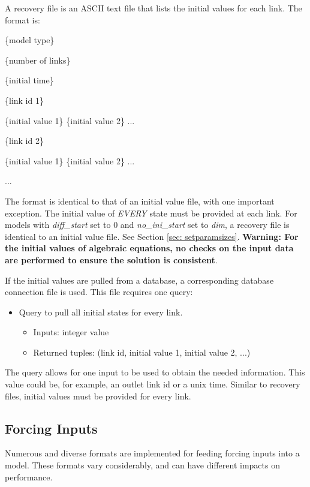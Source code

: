 \documentclass[12pt]{article}
\newenvironment{codeindent}
{\begin{list}{}
        {\setlength{\leftmargin}{.1in}}
        \item[]
}
{\end{list}}
\begin{document}
A recovery file is an ASCII text file that lists the initial values for each link. The format is:
\begin{codeindent}
 \{model type\}
 
 \{number of links\}
 
 \{initial time\}
 
 \{link id 1\}
 
 \{initial value 1\} \{initial value 2\} ...
 
 \{link id 2\}
 
 \{initial value 1\} \{initial value 2\} ...
 
 ...
\end{codeindent}
The format is identical to that of an initial value file, with one important exception. The initial value of \emph{EVERY} state must be provided at each link. For models with \emph{diff\_start} set to 0 and \emph{no\_ini\_start} set to \emph{dim}, a recovery file is identical to an initial value file. See Section \ref{sec: setparamsizes}. \textbf{Warning: For the initial values of algebraic equations, no checks on the input data are performed to ensure the solution is consistent}.

If the initial values are pulled from a database, a corresponding database connection file is used. This file requires one query:
\begin{itemize}
 \item Query to pull all initial states for every link. 
  \begin{itemize}
   \item Inputs: integer value
   \item Returned tuples: (link id, initial value 1, initial value 2, ...)
  \end{itemize}
\end{itemize}
The query allows for one input to be used to obtain the needed information. This value could be, for example, an outlet link id or a unix time. Similar to recovery files, initial values must be provided for every link.


\subsection{Forcing Inputs} \label{sec: forcing inputs}

Numerous and diverse formats are implemented for feeding forcing inputs into a model. These formats vary considerably, and can have different impacts on performance.
\end{document}
